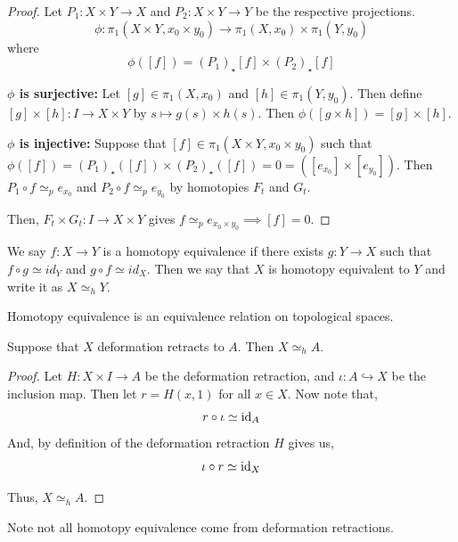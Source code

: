 \documentclass[12pt]{amsart}
\begin{document}
\begin{proof}
    Let $P_1: X\times Y \to X$ and $P_2: X \times Y \to Y$ be the respective projections. 
    \[\phi: \pi_1(X \times Y, x_0 \times y_0) \to \pi_1(X, x_0) \times \pi_1(Y, y_0)\]
    where
    \[\phi([f]) = (P_1)_\star[f] \times (P_2)_\star[f]\]
    
    \textbf{$\phi$ is surjective:} Let $[g] \in \pi_1(X, x_0)$ and $[h] \in \pi_1(Y, y_0)$. Then define $[g] \times [h]: I \to X \times Y$ by $s \mapsto g(s) \times h(s)$. Then $\phi([g\times h]) = [g] \times [h]$. 
    
    \textbf{$\phi$ is injective:} Suppose that $[f] \in \pi_1(X \times Y, x_0 \times y_0)$ such that $\phi([f]) = (P_1)_\star([f]) \times (P_2)_\star([f]) = 0 = ([e_{x_0}] \times [e_{y_0}])$. Then $P_1 \circ f \simeq_p e_{x_0}$ and $P_2 \circ f \simeq_p e_{y_0}$ by homotopies $F_t$ and $G_t$. 

    Then, $F_t \times G_t: I \to X \times Y$ gives $f \simeq_p e_{x_0 \times y_0} \implies [f] =0$.  
\end{proof}

\begin{definition}
    We say $f: X \to Y$ is a homotopy equivalence if there exists  $g: Y \to X$ such that $f \circ g \simeq id_Y$ and $g \circ f \simeq id_X$. Then we say that $X$ is homotopy equivalent to $Y$ and write it as $X \simeq_h Y$.
\end{definition}

\begin{remark}
    Homotopy equivalence is an equivalence relation on topological spaces. 
\end{remark}

\begin{proposition}
    Suppose that $X$ deformation retracts to $A$. Then $X \simeq_h A$. 
\end{proposition}

\begin{proof}
    Let $H: X \times I \to A$ be the deformation retraction, and $\iota: A \hookrightarrow X$ be the inclusion map. Then let $r = H(x, 1)$ for all $x \in X$. Now note that, 
    \[r \circ \iota \simeq \operatorname{id}_A\]
    And, by definition of the deformation retraction $H$ gives us, 
    \[\iota \circ r \simeq \operatorname{id}_X\]
    
    Thus, $X \simeq_h A$. 
\end{proof}

\begin{remark}
    Note not all homotopy equivalence come from deformation retractions. 
\end{remark}
\end{document}
